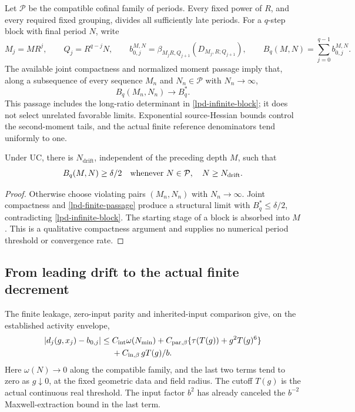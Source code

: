 Let \(\mathcal P\) be the compatible cofinal family of periods.
Every fixed power of \(R\), and every required fixed grouping,
divides all sufficiently late periods. For a \(q\)-step block
with final period \(N\), write
\begin{equation}
 M_j=MR^j,\qquad Q_j=R^{q-j}N,\qquad
 b_{0,j}^{M,N}
  =\beta_{M_jR,Q_{j+1}}(D_{M_j,R;Q_{j+1}}),\qquad
 B_q(M,N)=\sum_{j=0}^{q-1}b_{0,j}^{M,N}.
 \label{lpd-finite-block}
\end{equation}
The available joint compactness and normalized moment passage imply
that, along a subsequence of every sequence \(M_n\) and
\(N_n\in\mathcal P\) with \(N_n\to\infty\),
\begin{equation}
 B_q(M_n,N_n)\longrightarrow B_q^{*}.
 \label{lpd-finite-passage}
\end{equation}
This passage includes the long-ratio determinant in
\eqref{lpd-infinite-block}; it does not select unrelated favorable
limits. Exponential source-Hessian bounds control the second-moment
tails, and the actual finite reference denominators tend uniformly
to one.

\begin{lemma}
\label{lpd-finite-drift}
Under \(\mathrm{UC}\), there is \(N_{\mathrm{drift}}\), independent
of the preceding depth \(M\), such that
\begin{equation}
 B_q(M,N)\ge\delta/2
 \quad\hbox{whenever }N\in\mathcal P,\quad
                         N\ge N_{\mathrm{drift}}.
 \label{lpd-finite-leading-positive}
\end{equation}
\end{lemma}
\begin{proof}
Otherwise choose violating pairs \((M_n,N_n)\) with
\(N_n\to\infty\). Joint compactness and
\eqref{lpd-finite-passage} produce a structural limit with
\(B_q^{*}\le\delta/2\), contradicting
\eqref{lpd-infinite-block}. The starting stage of a block is absorbed
into \(M\). This is a qualitative compactness argument and supplies
no numerical period threshold or convergence rate.
\end{proof}

\subsection{From leading drift to the actual finite decrement}
\label{lpd-actual-drift}

The finite leakage, zero-input parity and inherited-input comparison
give, on the established activity envelope,
\begin{align}
 |d_j(g,x_j)-b_{0,j}|
 \le{}&C_{\mathrm{int}}\omega(N_{\min})
    +C_{\mathrm{par},\beta}
          \{\tau(T(g))+g^2T(g)^6\}\notag\\
 &+C_{\mathrm{in},\beta}\,gT(g)/b .
 \label{lpd-error}
\end{align}
Here \(\omega(N)\to0\) along the compatible family, and the last
two terms tend to zero as \(g\downarrow0\), at the fixed geometric
data and field radius. The cutoff \(T(g)\) is the actual continuous
real threshold. The input factor \(b^2\) has already canceled the
\(b^{-2}\) Maxwell-extraction bound in the last term.


